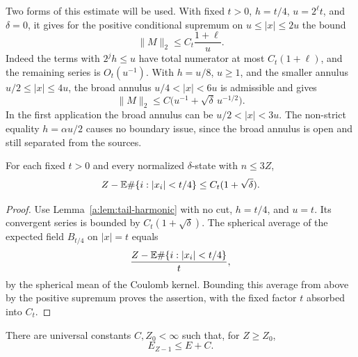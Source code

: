 Two forms of this estimate will be used.  With fixed $t>0$, $h=t/4$,
$u=2^\ell t$, and $\delta=0$, it gives for the positive conditional
supremum on $u\le|x|\le2u$ the bound
\begin{equation}\label{a:eq:tail-deletion-field}
 \|M\|_2\le C_t\frac{1+\ell}{u}.
\end{equation}
Indeed the terms with $2^jh\le u$ have total numerator at most
$C_t(1+\ell)$, and the remaining series is $O_t(u^{-1})$.
With $h=u/8$, $u\ge1$, and the smaller annulus $u/2\le|x|\le4u$,
the broad annulus $u/4<|x|<6u$ is admissible and gives
\begin{equation}\label{a:eq:tail-distant-field}
 \|M\|_2\le C\big(u^{-1}+\sqrt\delta\,u^{-1/2}\big).
\end{equation}
In the first application the broad annulus can be $u/2<|x|<3u$.
The non-strict equality $h=\alpha u/2$ causes no boundary issue, since
the broad annulus is open and still separated from the sources.

\begin{lemma}\label{a:lem:tail-deficit-upper}
For each fixed $t>0$ and every normalized $\delta$-state with $n\le3Z$,
\begin{equation}\label{a:eq:tail-deficit-upper}
 Z-\mathbb E\#\{i:|x_i|<t/4\}\le C_t(1+\sqrt\delta).
\end{equation}
\end{lemma}

\begin{proof}
Use Lemma~\ref{a:lem:tail-harmonic} with no cut, $h=t/4$, and $u=t$.
Its convergent series is bounded by $C_t(1+\sqrt\delta)$.  The
spherical average of the expected field $B_{t/4}$ on $|x|=t$ equals
\[
 \frac{Z-\mathbb E\#\{i:|x_i|<t/4\}}{t},
\]
by the spherical mean of the Coulomb kernel.  Bounding this average
from above by the positive supremum proves the assertion, with the
fixed factor $t$ absorbed into $C_t$.
\end{proof}

\begin{proposition}\label{a:prop:tail-offset}
There are universal constants $C,Z_0<\infty$ such that, for $Z\ge Z_0$,
\begin{equation}\label{a:eq:tail-offset}
 E_{Z-1}\le E+C.
\end{equation}
\end{proposition}

